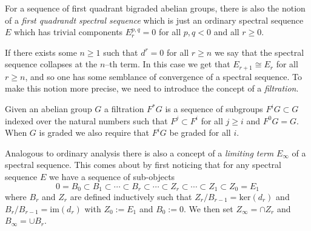 \documentclass[../main.tex]{subfiles}
\begin{document}
For a sequence of first quadrant bigraded abelian groups, there is also
the notion of a \emph{first quadrandt spectral sequence} which is
just an ordinary spectral sequence \( E \) which has trivial components
\( E^{p,q}_r=0 \) for all \( p,q < 0 \) and all \( r\geq 0 \).

If there exists some \( n\geq 1 \) such that \( d^r=0 \) for all \( r\geq n \) we say that the spectral sequence collapses at
the \( n \)--th term. In this case we get that \( E_{r+1}\cong E_r \)
for all \( r\geq n \), and so one has some semblance of convergence of
a spectral sequence. To make this notion more precise, we need to
introduce the concept of a \emph{filtration}.
\begin{definition}
    Given an abelian group \( G \) a filtration \( F^*G \) is a
    sequence of subgroups \( F^iG\subset G \) indexed over the natural numbers
    such that \( F^j \subset F^i \) for all \( j\geq i \) and \( F^0G=G \).
When \( G \) is graded we also require that \( F^i G \) be graded for all
\( i \).
\end{definition}
Analogous to ordinary analysis there is also a concept of a \emph{limiting
term} \( E_\infty \) of a spectral sequence. This comes about by first
noticing that for any spectral sequence \( E \) we have a sequence
of sub-objects \[ 0=B_0\subset B_1 \subset \cdots\subset B_r \subset
\cdots\subset Z_r\subset\cdots\subset Z_1\subset Z_0=E_1 \] where
\( B_r \) and \( Z_r \) are defined inductively such that \( Z_r/B_{r-1}
=\text{ker}(d_r)\)
and \( B_r/B_{r-1}=\text{im}(d_r) \) with \( Z_0:=E_1 \) and \( B_0:=0 \). We then set \( Z_\infty = \cap Z_r \) and \( B_\infty=\cup B_r \).
\end{document}
